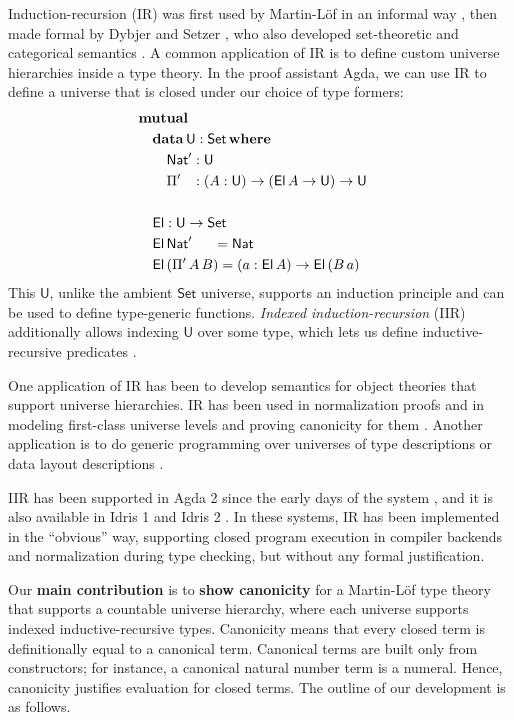 \documentclass[acmsmall,screen,review,anonymous]{acmart}
\newcommand{\msf}[1]{{\mathsf{#1}}}
\newcommand{\mbf}[1]{{\mathbf{#1}}}
\newcommand{\data}{\mbf{data}}
\newcommand{\U}{\msf{U}}
\newcommand{\Set}{\msf{Set}}
\newcommand{\where}{\mbf{where}}
\newcommand{\Nat}{\msf{Nat}}
\newcommand{\El}{\msf{El}}
\begin{document}
Induction-recursion (IR) was first used by Martin-Löf in an informal way \cite{TODO}, then made
formal by Dybjer and Setzer \cite{TODO}, who also developed set-theoretic and categorical semantics
\cite{TODO}. A common application of IR is to define custom universe hierarchies inside a type
theory. In the proof assistant Agda, we can use IR to define a universe that is closed under our
choice of type formers:
\begin{alignat*}{3}
  & \mbf{mutual} \\
  & \quad\data\,\U : \Set\,\where \\
  & \quad\quad \Nat' : \U\\
  & \quad\quad \Pi' \hspace{0.8em} : (A : \U) \to (\El\,A \to \U) \to \U
  & \\
  & \\
  & \quad\El : \U \to \Set \\
  & \quad\El\,\Nat'\hspace{1.5em}  = \Nat \\
  & \quad\El\,(\Pi'\,A\,B) = (a : \El\,A) \to \El\,(B\,a)
\end{alignat*}
This $\U$, unlike the ambient $\Set$ universe, supports an induction principle and can be used to
define type-generic functions. \emph{Indexed induction-recursion} (IIR) additionally allows indexing
$\U$ over some type, which lets us define inductive-recursive predicates \cite{TODO}.

One application of IR has been to develop semantics for object theories that support universe
hierarchies. IR has been used in normalization proofs \cite{TODO} and in modeling first-class
universe levels \cite{TODO} and proving canonicity for them \cite{TODO}. Another application is to
do generic programming over universes of type descriptions \cite{TODO} or data layout descriptions
\cite{TODO}.

IIR has been supported in Agda 2 since the early days of the system \cite{TODO}, and it is also
available in Idris 1 and Idris 2 \cite{TODO}. In these systems, IR has been implemented in the
``obvious'' way, supporting closed program execution in compiler backends and normalization during
type checking, but without any formal justification.

Our \textbf{main contribution} is to \textbf{show canonicity} for a Martin-Löf type theory that
supports a countable universe hierarchy, where each universe supports indexed inductive-recursive
types. Canonicity means that every closed term is definitionally equal to a canonical
term. Canonical terms are built only from constructors; for instance, a canonical natural number
term is a numeral. Hence, canonicity justifies evaluation for closed terms. The outline of our
development is as follows.
\end{document}
